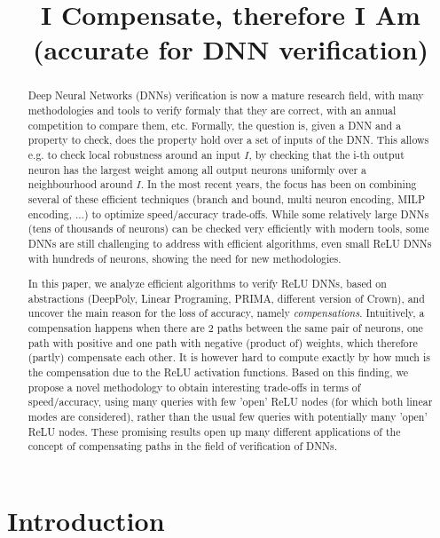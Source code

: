 \documentclass{llncs}
\title{I Compensate, therefore I Am \\ (accurate for DNN verification)}
\date{}
\begin{document}
\maketitle

\begin{abstract}
  Deep Neural Networks (DNNs) verification is now a mature research field, with many methodologies and tools to verify formaly  that they are correct, with an annual competition to compare them, etc. Formally, the question is, given a DNN and a property to check, does the property hold over a set of inputs of the DNN. This allows e.g. to check local robustness around an input $I$, by checking that the i-th output neuron has the largest weight among all output neurons uniformly over a neighbourhood around $I$.
  In the most recent years, the focus has been on combining several of these efficient techniques (branch and bound, multi neuron encoding, MILP encoding, ...) to optimize speed/accuracy trade-offs. While some relatively large DNNs (tens of thousands of neurons) can be checked very efficiently with modern tools, some DNNs are still challenging to address with efficient algorithms, even small ReLU DNNs with hundreds of neurons, showing the need for new methodologies.

  In this paper, we analyze efficient algorithms to verify ReLU DNNs, based on abstractions (DeepPoly, Linear Programing, PRIMA, different version of Crown), and uncover the main reason for the loss of accuracy, namely {\em compensations}. Intuitively, a compensation happens when there are 2 paths between the same pair of neurons, one path with positive and one path with negative (product of) weights, which therefore (partly) compensate each other. It is however hard to compute exactly by how much is the compensation due to the ReLU activation functions. Based on this finding, we propose a novel methodology to obtain interesting trade-offs in terms of speed/accuracy, using many queries with few 'open' ReLU nodes (for which both linear modes are considered), rather than the usual few queries with potentially many 'open' ReLU nodes. These promising results open up many different applications of the concept of compensating paths in the field of verification of DNNs.
\end{abstract}


\section{Introduction}


\end{document}
